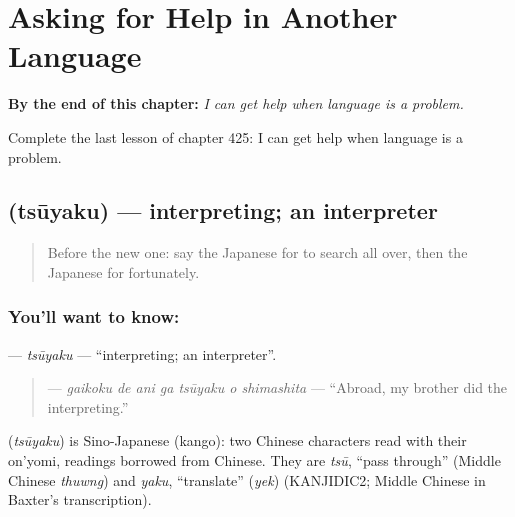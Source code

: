 
\chapter{Asking for Help in Another Language}
\label{ch:ja-asking-for-help-in-another-language}

\begin{chapteropening}
\textbf{By the end of this chapter:} \emph{I can get help when language is a problem.}

Complete the last lesson of chapter 425: I can get help when language is a problem.
\end{chapteropening}

\section[\texorpdfstring{\ja{つうやく} (tsūyaku)}{つうやく (tsūyaku)}]{ (tsūyaku) — interpreting; an interpreter}

\label{lesson:JA-C425-tsuuyaku}



\begin{quote}
Before the new one: say the Japanese for to search all over, then the Japanese for fortunately.
\end{quote}

\subsection*{You'll want to know: }
\textbf{} — \emph{tsūyaku} — \textquotedblleft{}interpreting; an interpreter\textquotedblright{}.

\begin{quote}
\textbf{   } — \emph{gaikoku de ani ga tsūyaku o shimashita} — \textquotedblleft{}Abroad, my brother did the interpreting.\textquotedblright{}
\end{quote}

\begin{cousinweb}
\textbf{} (\emph{tsūyaku}) is Sino-Japanese (kango): two Chinese characters read with their on'yomi, readings borrowed from Chinese. They are \emph{tsū}, \textquotedblleft{}pass through\textquotedblright{} (Middle Chinese \emph{thuwng}) and \emph{yaku}, \textquotedblleft{}translate\textquotedblright{} (\emph{yek}) (KANJIDIC2; Middle Chinese in Baxter's transcription).
\end{cousinweb}

